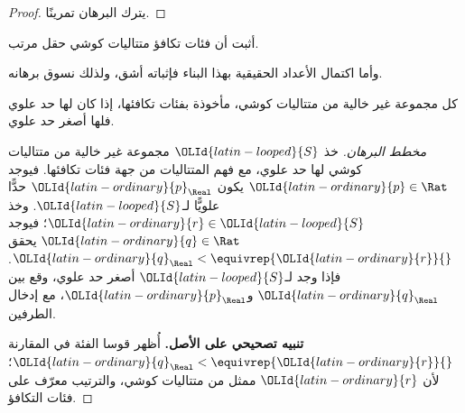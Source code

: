\documentclass[../../../include/open-logic-section]{subfiles}
\begin{document}
\begin{proof}
يترك البرهان تمرينًا.
\end{proof}

\begin{prob}
أثبت أن فئات تكافؤ متتاليات كوشي حقل مرتب.
\end{prob}

وأما اكتمال الأعداد الحقيقية بهذا البناء فإثباته أشق، ولذلك نسوق برهانه.

\begin{thm}
كل مجموعة غير خالية من متتاليات كوشي، مأخوذة بفئات تكافئها، إذا كان لها حد علوي فلها أصغر حد علوي.
\end{thm}

\begin{proof}[مخطط البرهان]
خذ $\OLId{latin-looped}{S}$ مجموعة غير خالية من متتاليات كوشي لها حد علوي، مع فهم المتتاليات من جهة فئات تكافئها. فيوجد $\OLId{latin-ordinary}{p} \in \Rat$ يكون $\OLId{latin-ordinary}{p}_{\Real}$ حدًّا علويًّا لـ$\OLId{latin-looped}{S}$. وخذ $\OLId{latin-ordinary}{r} \in \OLId{latin-looped}{S}$؛ فيوجد $\OLId{latin-ordinary}{q} \in \Rat$ يحقق $\OLId{latin-ordinary}{q}_{\Real} < \equivrep{\OLId{latin-ordinary}{r}}{}$. فإذا وجد لـ$\OLId{latin-looped}{S}$ أصغر حد علوي، وقع بين $\OLId{latin-ordinary}{q}_\Real$ و$\OLId{latin-ordinary}{p}_\Real$، مع إدخال الطرفين.

\textbf{تنبيه تصحيحي على الأصل.} أُظهر قوسا الفئة في المقارنة
$\OLId{latin-ordinary}{q}_\Real < \equivrep{\OLId{latin-ordinary}{r}}{}$؛ لأن $\OLId{latin-ordinary}{r}$ ممثل من متتاليات كوشي، والترتيب
معرّف على فئات التكافؤ.


\end{proof}
\end{document}

